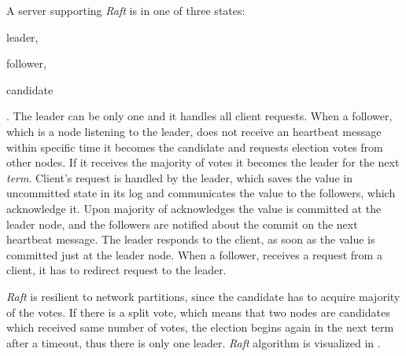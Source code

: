 A server supporting \emph{Raft} is in one of three states: \begin{enumerate*} \item leader, \item follower, \item candidate \end{enumerate*}. The leader can be only one and it handles all client requests.
  When a follower, which is a node listening to the leader, does not receive an heartbeat message within specific time it becomes the candidate and requests election votes from other nodes. If it receives the majority of votes it becomes the leader for the next \emph{term}. Client's request is handled by the leader, which saves the value in uncommitted state in its log and communicates the value to the followers, which acknowledge it. Upon majority of acknowledges the value is committed at the leader node, and the followers are notified about the commit on the next heartbeat message. The leader responds to the client, as soon as the value is committed just at the leader node. When a follower, receives a request from a client, it has to redirect request to the leader.

  \emph{Raft} is resilient to network partitions, since the candidate has to acquire majority of the votes. If there is a split vote, which means that two nodes are candidates which received same number of votes, the election begins again in the next term after a timeout, thus there is only one leader.
  \emph{Raft} algorithm is visualized in \cite{raftVisual}.






